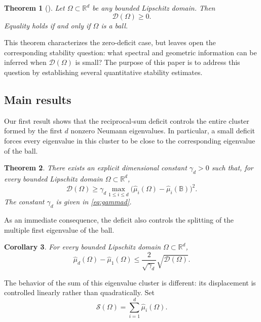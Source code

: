 \documentclass{amsart}
\numberwithin{equation}{section}
\theoremstyle{plain}
\newtheorem{theorem}{Theorem}[section]
\newtheorem{corollary}[theorem]{Corollary}
\theoremstyle{definition}
\theoremstyle{plain}
\theoremstyle{remark}
\numberwithin{figure}{section}
\newcommand{\B}{\mathbb{B}}
\newcommand{\muu}{\widehat{\mu}}
\newcommand{\D}{\mathcal{D}(\Omega)}
\newcommand{\s}{\mathcal{S}(\Omega)}
\begin{document}
\begin{theorem}[{\cite[Theorem 1.2]{HLT26+}}]
    \label{thm:HLT}
    Let $\Omega\subset\mathbb{R}^d$ be any bounded Lipschitz domain. Then
    \[
        \D\geq 0.
    \]
    Equality holds if and only if $\Omega$ is a ball.
\end{theorem}

This theorem characterizes the zero-deficit case, but leaves open the corresponding stability question: what spectral and geometric information can be inferred when $\D$ is small? The purpose of this paper is to address this question by establishing several quantitative stability estimates.

\subsection{Main results}
Our first result shows that the reciprocal-sum deficit controls the entire cluster formed by the first $d$ nonzero Neumann eigenvalues. In particular, a small deficit forces every eigenvalue in this cluster to be close to the corresponding eigenvalue of the ball.

\begin{theorem}
    \label{thm:recsummui}
    There exists an explicit dimensional constant $\gamma_d>0$ such that, for every bounded Lipschitz domain $\Omega\subset\mathbb{R}^d$,
    \begin{equation}
        \label{eq:inversesumSWdeficit}
        \D \geq \gamma_d \max_{1\leq i\leq d} \big(\muu_i(\Omega)-\muu_i(\B)\big)^2.
    \end{equation}
    The constant $\gamma_d$ is given in \eqref{eq:gammad}.
\end{theorem} 

As an immediate consequence, the deficit also controls the splitting of the multiple first eigenvalue of the ball.

\begin{corollary}
    \label{cor:recsumspecgap}
    For every bounded Lipschitz domain $\Omega\subset\mathbb{R}^d$,
    \begin{equation}
        \label{eq:inversesumspecgap}
        \muu_d(\Omega)-\muu_1(\Omega) \leq \frac{2}{\sqrt{\gamma_d}}\sqrt{\D}.
    \end{equation}
\end{corollary}

The behavior of the sum of this eigenvalue cluster is different: its displacement is controlled linearly rather than quadratically. Set
\[
    \s=\sum_{i=1}^d\muu_i(\Omega).
\]
\end{document}
